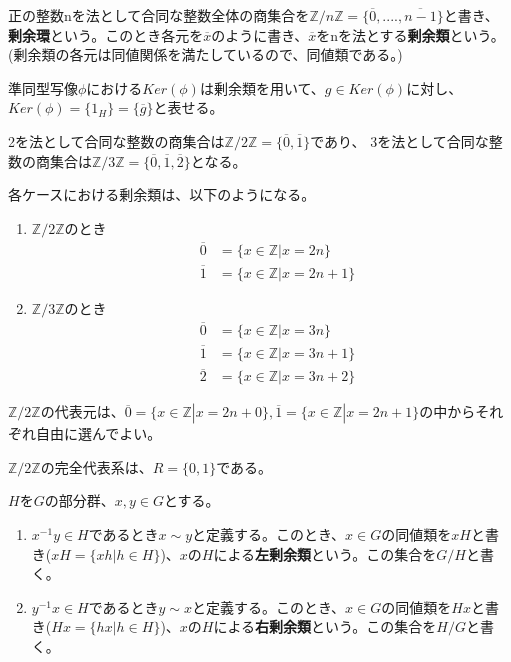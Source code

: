 \documentclass[dvipdfmx,autodetect-engine]{jsarticle}
\begin{document}
\label{defi:IntegerCoset}

正の整数nを法として合同な整数全体の商集合を$\mathbb{Z}/n\mathbb{Z} = \{\overline{0}, ...., \overline{n - 1}\}$と書き、{\bf 剰余環}という。このとき各元を$\overline{x}$のように書き、$\overline{x}$をnを法とする{\bf 剰余類}という。(剰余類の各元は同値関係を満たしているので、同値類である。)

\exam 準同型写像$\phi$における$Ker(\phi)$は剰余類を用いて、$g \in Ker(\phi)$に対し、$Ker(\phi) = \{1_H\} = \{\overline{g}\}$と表せる。

\exam 2を法として合同な整数の商集合は$\mathbb{Z}/2\mathbb{Z} = \{\overline{0}, \overline{1}\}$であり、
3を法として合同な整数の商集合は$\mathbb{Z}/3\mathbb{Z} = \{\overline{0}, \overline{1}, \overline{2}\}$となる。

各ケースにおける剰余類は、以下のようになる。

\begin{enumerate}
\renewcommand{\labelenumi}{(\arabic{enumi})}
\item $\mathbb{Z}/2\mathbb{Z}$のとき
\begin{eqnarray*}
&\overline{0} &= \{x \in \mathbb{Z}|x = 2n\} \\
&\overline{1} &= \{x \in \mathbb{Z}|x = 2n + 1\}
\end{eqnarray*}

\item $\mathbb{Z}/3\mathbb{Z}$のとき
\begin{eqnarray*}
&\overline{0} &= \{x \in \mathbb{Z}|x = 3n\} \\
&\overline{1} &= \{x \in \mathbb{Z}|x = 3n + 1\} \\
&\overline{2} &= \{x \in \mathbb{Z}|x = 3n + 2\}
\end{eqnarray*}
\end{enumerate}


$\mathbb{Z}/2\mathbb{Z}$の代表元は、$\overline{0} = \{x \in \mathbb{Z}|x = 2n + 0\}, \overline{1} = \{x \in \mathbb{Z}|x = 2n + 1\}$の中からそれぞれ自由に選んでよい。


$\mathbb{Z}/2\mathbb{Z}$の完全代表系は、$R = \{0, 1\}$である。

 $H$を$G$の部分群、$x, y \in G$とする。

\begin{enumerate}
\renewcommand{\labelenumi}{(\arabic{enumi})}
\item $x^{-1}y \in H$であるとき$x \sim y$と定義する。このとき、$x \in G$の同値類を$xH$と書き($xH = \{xh | h \in H\}$)、$x$の$H$による{\bf 左剰余類}という。この集合を$G/H$と書く。
\item $y^{-1}x \in H$であるとき$y \sim x$と定義する。このとき、$x \in G$の同値類を$Hx$と書き($Hx = \{hx | h \in H\}$)、$x$の$H$による{\bf 右剰余類}という。この集合を$H/G$と書く。
\end{enumerate}
\end{document}
